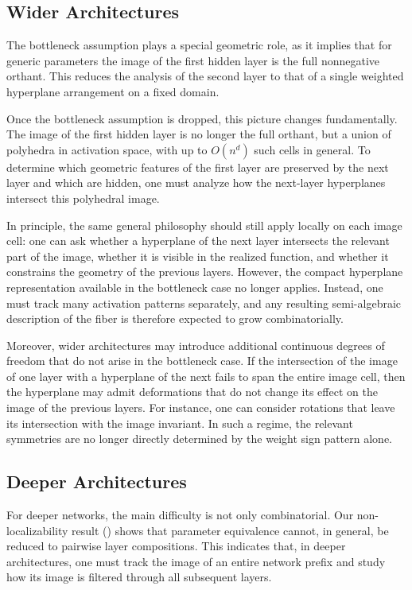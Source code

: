 \documentclass{article}
\theoremstyle{definition}
\begin{document}
\subsection{Wider Architectures}

The bottleneck assumption plays a special geometric role, as it implies that for generic parameters the image of the first hidden layer is the full nonnegative orthant. 
This reduces the analysis of the second layer to that of 
a single weighted hyperplane arrangement on a fixed domain. 

Once the bottleneck assumption is dropped, this picture changes fundamentally. 
The image of the first hidden layer is no longer the full orthant, but a union of polyhedra in activation space, with up to $O(n^d)$ such cells in general. 
To determine which geometric features of the first layer are preserved by the next layer and which are hidden, one must analyze how the next-layer hyperplanes intersect this polyhedral image. 

In principle, the same general philosophy should still apply locally on each image cell: 
one can ask whether a hyperplane of the next layer 
intersects the relevant part of the image, 
whether it is visible in the realized function, 
and whether it constrains the geometry of the previous layers. 
However, the compact hyperplane representation available in the bottleneck case no longer applies. 
Instead, one must track many activation patterns separately, and any resulting semi-algebraic description of the fiber is therefore expected to grow combinatorially. 

Moreover, wider architectures may introduce additional continuous degrees of freedom that do not arise in the bottleneck case. 
If the intersection of the image of one layer with a hyperplane of the next fails to span the entire image cell, 
then the hyperplane may admit deformations that do not change its effect on the image of the previous layers. 
For instance, one can consider rotations that leave its intersection with the image invariant. 
In such a regime, the relevant symmetries are no longer directly determined by the weight sign pattern alone. 


\subsection{Deeper Architectures}

For deeper networks, the main difficulty is not only combinatorial. 
Our non-localizability result () shows that parameter equivalence cannot, in general, be reduced to pairwise layer compositions. 
This indicates that, in deeper architectures, one must track the image of an entire network prefix and study how its image is filtered through all subsequent layers.
\end{document}
